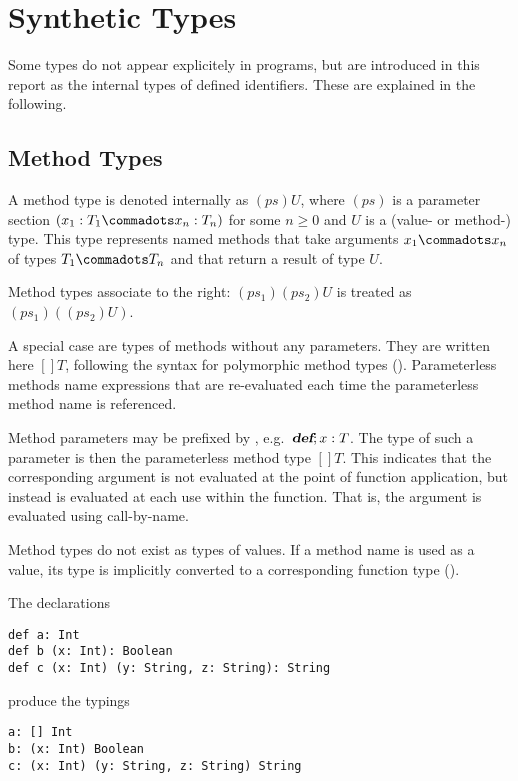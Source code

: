 \documentclass[11pt]{report}
\renewcommand{\todo}[1]{}
\begin{document}
\section{Synthetic Types}
\label{sec:synthetic-types}

Some types do not appear explicitely in programs, but are introduced
in this report as the internal types of defined identifiers. These are
explained in the following.

\subsection{Method Types}
\label{sec:method-types}\todo{Change Syntax}

A method type is denoted internally as $(ps)U$, where $(ps)$ is a
parameter section $(x_1: T_1 \commadots x_n: T_n)$ for some $n \geq 0$
and $U$ is a (value- or method-) type.  This type represents named
methods that take arguments $x_1 \commadots x_n$ of types $T_1
\commadots T_n$ and that return a result of type $U$.

Method types associate to the right: $(ps_1)(ps_2)U$ is treated as
$(ps_1)((ps_2)U)$.

A special case are types of methods without any parameters. They are
written here $[]T$, following the syntax for polymorphic method types
(). Parameterless methods name expressions that
are re-evaluated each time the parameterless method name is
referenced.

Method parameters may be prefixed by \verb@def@, e.g.\ $\mbox{\sl\bfseries def};x:T$. The
type of such a parameter is then the parameterless method type
$[]T$. This indicates that the corresponding argument is not evaluated
at the point of function application, but instead is evaluated at each
use within the function. That is, the argument is evaluated using
call-by-name.

Method types do not exist as types of values. If a method name is used
as a value, its type is implicitly converted to a corresponding function
type ().

\example The declarations
\begin{verbatim}
def a: Int
def b (x: Int): Boolean
def c (x: Int) (y: String, z: String): String
\end{verbatim}
produce the typings
\begin{verbatim}
a: [] Int
b: (x: Int) Boolean
c: (x: Int) (y: String, z: String) String
\end{verbatim}
\end{document}
